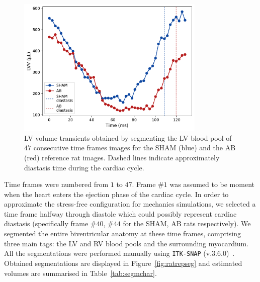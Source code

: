 \begin{figure}[ht!]
    \myfloatalign
    \includegraphics[width=0.8\textwidth]{figures/chapter04/lvv_experimental_transient.pdf}
    \caption{LV volume transients obtained by segmenting the LV blood pool of $47$ consecutive time frames images for the SHAM (blue) and the AB (red) reference rat images. Dashed lines indicate approximately diastasis time during the cardiac cycle.}
    \label{fig:lvvexptransients}
\end{figure}

\vspace{0.2cm}
Time frames were numbered from $1$ to $47$. Frame $\#1$ was assumed to be moment when the heart enters the ejection phase of the cardiac cycle. In order to approximate the stress-free configuration for mechanics simulations, we selected a time frame halfway through diastole which could possibly represent cardiac diastasis (specifically frame $\#40$, $\#44$ for the SHAM, AB rats respectively). We segmented the entire biventricular anatomy at these time frames, comprising three main tags: the LV and RV blood pools and the surrounding myocardium. All the segmentations were performed manually using \texttt{ITK-SNAP} (v.$3.6.0$)~\cite{Yushkevich:2006}. Obtained segmentations are displayed in Figure~\ref{fig:ratrepseg} and estimated volumes are summarised in Table~\ref{tab:segmchar}.

